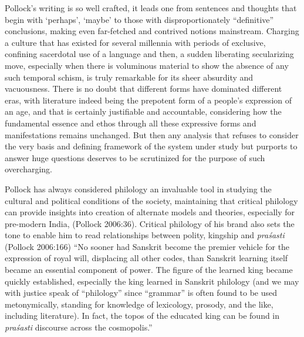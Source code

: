 Pollock’s writing is so well crafted, it leads one from sentences and thoughts that begin with ‘perhaps’, ‘maybe’ to those with disproportionately “definitive” conclusions, making even far-fetched and contrived notions mainstream. Charging a culture that has existed for several millennia with periods of exclusive, confining sacerdotal use of a language and then, a sudden liberating secularizing move, especially when there is voluminous material to show the absence of any such temporal schism, is truly remarkable for its sheer absurdity and vacuousness. There is no doubt that different forms have dominated different eras, with literature indeed being the prepotent form of a people’s expression of an age, and that is certainly justifiable and accountable, considering how the fundamental essence and ethos through all these expressive forms and manifestations remains unchanged. But then any analysis that refuses to consider the very basis and defining framework of the system under study but purports to answer huge questions deserves to be scrutinized for the purpose of such overcharging.

Pollock has always considered philology an invaluable tool in studying the cultural and political conditions of the society, maintaining that critical philology can provide insights into creation of alternate models and theories, especially for pre-modern India, (Pollock 2006:36). Critical philology of his brand also sets the tone to enable him to read relationships between polity, kingship and \textit{praśasti} (Pollock 2006:166) “No sooner had Sanskrit become the premier vehicle for the expression of royal will, displacing all other codes, than Sanskrit learning itself became an essential component of power. The figure of the learned king became quickly established, especially the king learned in Sanskrit philology (and we may with justice speak of “philology” since “grammar” is often found to be used metonymically, standing for knowledge of lexicology, prosody, and the like, including literature). In fact, the topos of the educated king can be found in \textit{praśasti} discourse across the cosmopolis.”


